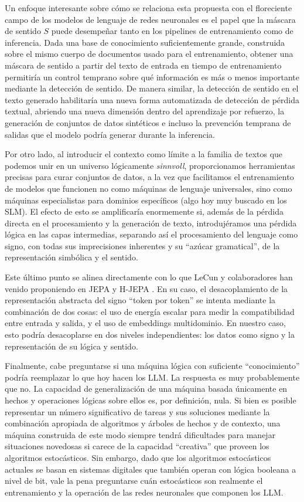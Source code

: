 \documentclass{article}
\begin{document}
Un enfoque interesante sobre cómo se relaciona esta propuesta con el
floreciente campo de los modelos de lenguaje de redes neuronales es el
papel que la máscara de sentido \(S\) puede desempeñar tanto en los
pipelines de entrenamiento como de inferencia. Dada una base de
conocimiento suficientemente grande, construida sobre el mismo cuerpo de
documentos usado para el entrenamiento, obtener una máscara de sentido a
partir del texto de entrada en tiempo de entrenamiento permitiría un
control temprano sobre qué información es más o menos importante
mediante la detección de sentido. De manera similar, la detección de
sentido en el texto generado habilitaría una nueva forma automatizada de
detección de pérdida textual, abriendo una nueva dimensión dentro del
aprendizaje por refuerzo, la generación de conjuntos de datos sintéticos
e incluso la prevención temprana de salidas que el modelo podría generar
durante la inferencia.

Por otro lado, al introducir el contexto como límite a la familia de
textos que podemos unir en un universo lógicamente \emph{sinnvoll},
proporcionamos herramientas precisas para curar conjuntos de datos, a la
vez que facilitamos el entrenamiento de modelos que funcionen no como
máquinas de lenguaje universales, sino como máquinas especialistas para
dominios específicos (algo hoy muy buscado en los SLM). El efecto de
esto se amplificaría enormemente si, además de la pérdida directa en el
procesamiento y la generación de texto, introdujéramos una pérdida
lógica en las capas intermedias, separando así el procesamiento del
lenguaje como signo, con todas sus imprecisiones inherentes y su
``azúcar gramatical'', de la representación simbólica y el sentido.

Este último punto se alinea directamente con lo que LeCun y
colaboradores han venido proponiendo en JEPA y H-JEPA
\citep{lecun2022path, dawid2024latent, assran2023ijepa}. En su caso, el
desacoplamiento de la representación abstracta del signo ``token por
token'' se intenta mediante la combinación de dos cosas: el uso de
energía escalar para medir la compatibilidad entre entrada y salida, y
el uso de embeddings multidominio. En nuestro caso, esto podría
desacoplarse en dos niveles independientes: los datos como signo y la
representación de su lógica y sentido.

Finalmente, cabe preguntarse si una máquina lógica con suficiente
``conocimiento'' podría reemplazar lo que hoy hacen los LLM. La
respuesta es muy probablemente que no. La capacidad de generalización de
una máquina basada únicamente en hechos y operaciones lógicas sobre
ellos es, por definición, nula. Si bien es posible representar un número
significativo de tareas y sus soluciones mediante la combinación
apropiada de algoritmos y árboles de hechos y de contexto, una máquina
construida de este modo siempre tendrá dificultades para manejar
situaciones novedosas si carece de la capacidad ``creativa'' que proveen
los algoritmos estocásticos. Sin embargo, dado que los algoritmos
estocásticos actuales se basan en sistemas digitales que también operan
con lógica booleana a nivel de bit, vale la pena preguntarse cuán
estocásticos son realmente el entrenamiento y la operación de las redes
neuronales que componen los LLM.
\end{document}
